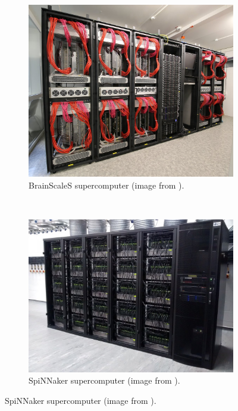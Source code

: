 \begin{figure}[!ht]
    \centering
    \begin{subfigure}[b]{0.47\textwidth}
        \includegraphics[width=\textwidth]{figures/brainscales.jpg}
        \caption{BrainScaleS supercomputer (image from \cite{nmp}).}
        \label{fig:brainscales}
    \end{subfigure}%
    ~ %
    \begin{subfigure}[b]{0.53\textwidth}
        \includegraphics[width=\textwidth]{figures/spinnaker106.jpg}
        \caption{SpiNNaker supercomputer (image from \cite{nmp}).}
        \label{fig:spinnaker106}
    \end{subfigure}
\end{figure} 

